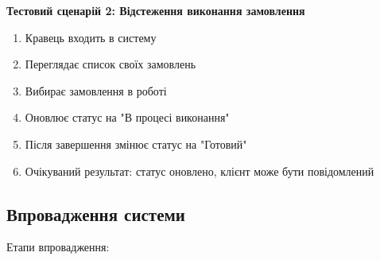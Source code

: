 \documentclass[14pt,a4paper]{extarticle}
\begin{document}
\textbf{Тестовий сценарій 2: Відстеження виконання замовлення}

\begin{enumerate}
    \item Кравець входить в систему
    \item Переглядає список своїх замовлень
    \item Вибирає замовлення в роботі
    \item Оновлює статус на "В процесі виконання"
    \item Після завершення змінює статус на "Готовий"
    \item Очікуваний результат: статус оновлено, клієнт може бути повідомлений
\end{enumerate}

\subsection{Впровадження системи}

Етапи впровадження:
\end{document}
